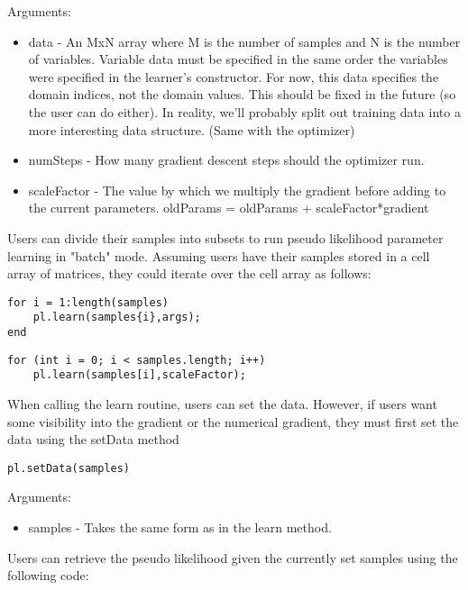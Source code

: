 Arguments:
\begin{itemize}
\item data - An MxN array where M is the number of samples and N is the number of variables.  Variable data must be specified in the same order the variables were specified in the learner's constructor.  For now, this data specifies the domain indices, not the domain values.  This should be fixed in the future (so the user can do either).  In reality, we'll probably split out training data into a more interesting data structure.  (Same with the optimizer) 
\item numSteps - How many gradient descent steps should the optimizer run. 
\item scaleFactor - The value by which we multiply the gradient before adding to the current parameters.  oldParams = oldParams + scaleFactor*gradient
\end{itemize}

\fi

Users can divide their samples into subsets to run pseudo likelihood parameter learning in "batch" mode.  Assuming users have their samples stored in a \ifmatlab cell \fi array of matrices, they could iterate over the cell array as follows:

\ifmatlab
\begin{lstlisting}
for i = 1:length(samples)
    pl.learn(samples{i},args);
end
\end{lstlisting}
\fi

\ifjava
\begin{lstlisting}
for (int i = 0; i < samples.length; i++)
    pl.learn(samples[i],scaleFactor);
\end{lstlisting}
\fi

When calling the learn routine, users can set the data.  However, if users want some visibility into the gradient or the numerical gradient, they must first set the data using the setData method

\begin{lstlisting}
pl.setData(samples)
\end{lstlisting}

Arguments:
\begin{itemize}
\item samples - Takes the same form as in the learn method.
\end{itemize}

Users can retrieve the pseudo likelihood given the currently set samples using the following code:

